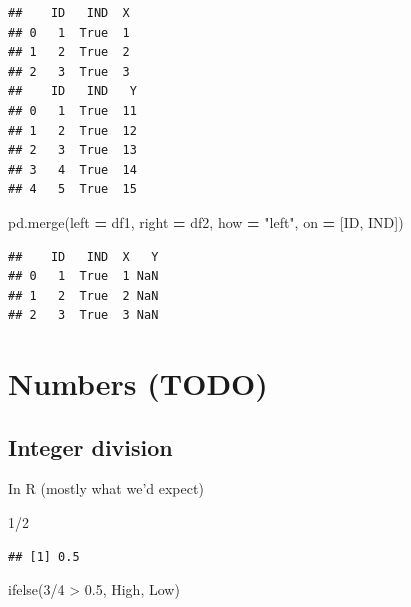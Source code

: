 \documentclass[
]{krantz}
\makeatletter
\newenvironment{Shaded}{\begin{snugshade}}{\end{snugshade}}
\newcommand{\DecValTok}[1]{\textcolor[rgb]{0.06,0.06,0.06}{#1}}
\newcommand{\FloatTok}[1]{\textcolor[rgb]{0.06,0.06,0.06}{#1}}
\newcommand{\FunctionTok}[1]{\textcolor[rgb]{0,0,0}{#1}}
\newcommand{\NormalTok}[1]{#1}
\newcommand{\OperatorTok}[1]{\textcolor[rgb]{0.43,0.43,0.43}{\textbf{#1}}}
\newcommand{\SpecialCharTok}[1]{\textcolor[rgb]{0,0,0}{#1}}
\newcommand{\StringTok}[1]{\textcolor[rgb]{0.5,0.5,0.5}{#1}}
\newenvironment{kframe}{%
\medskip{}
\setlength{\fboxsep}{.8em}
 \def\at@end@of@kframe{}%
 \ifinner\ifhmode%
  \def\at@end@of@kframe{\end{minipage}}%
  \begin{minipage}{\columnwidth}%
 \fi\fi%
 \def\FrameCommand##1{\hskip\@totalleftmargin \hskip-\fboxsep
 \colorbox{shadecolor}{##1}\hskip-\fboxsep
     \hskip-\linewidth \hskip-\@totalleftmargin \hskip\columnwidth}%
 \MakeFramed {\advance\hsize-\width
   \@totalleftmargin\z@ \linewidth\hsize
   \@setminipage}}%
 {\par\unskip\endMakeFramed%
 \at@end@of@kframe}
\renewenvironment{Shaded}{\begin{kframe}}{\end{kframe}}
\makeatother
\begin{document}
\begin{verbatim}
##    ID   IND  X
## 0   1  True  1
## 1   2  True  2
## 2   3  True  3
##    ID   IND   Y
## 0   1  True  11
## 1   2  True  12
## 2   3  True  13
## 3   4  True  14
## 4   5  True  15
\end{verbatim}

\begin{Shaded}
\begin{Highlighting}[]
\NormalTok{pd.merge(left }\OperatorTok{=}\NormalTok{ df1, right }\OperatorTok{=}\NormalTok{ df2, how }\OperatorTok{=} \StringTok{"left"}\NormalTok{, on }\OperatorTok{=}\NormalTok{ [}\StringTok{\textquotesingle{}ID\textquotesingle{}}\NormalTok{, }\StringTok{\textquotesingle{}IND\textquotesingle{}}\NormalTok{])}
\end{Highlighting}
\end{Shaded}

\begin{verbatim}
##    ID   IND  X   Y
## 0   1  True  1 NaN
## 1   2  True  2 NaN
## 2   3  True  3 NaN
\end{verbatim}

\hypertarget{numbers-todo}{%
\section{Numbers (TODO)}\label{numbers-todo}}

\hypertarget{integer-division}{%
\subsection{Integer division}\label{integer-division}}

In R (mostly what we'd expect)

\begin{Shaded}
\begin{Highlighting}[]
\DecValTok{1}\SpecialCharTok{/}\DecValTok{2}
\end{Highlighting}
\end{Shaded}

\begin{verbatim}
## [1] 0.5
\end{verbatim}

\begin{Shaded}
\begin{Highlighting}[]
\FunctionTok{ifelse}\NormalTok{(}\DecValTok{3}\SpecialCharTok{/}\DecValTok{4} \SpecialCharTok{\textgreater{}} \FloatTok{0.5}\NormalTok{, }\StringTok{\textquotesingle{}High\textquotesingle{}}\NormalTok{, }\StringTok{\textquotesingle{}Low\textquotesingle{}}\NormalTok{)}
\end{Highlighting}
\end{Shaded}
\end{document}
